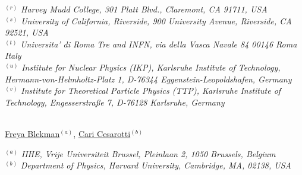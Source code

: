 {\begin{center}
$^{(r)}$ \emph{Harvey Mudd College, 301 Platt Blvd., Claremont, CA 91711, USA}\\
$^{(s)}$ \emph{University of California, Riverside, 900 University Avenue, Riverside, CA 92521, USA}\\
$^{(t)}$ \emph{Universita' di Roma Tre and INFN, via della Vasca Navale 84 00146 Roma Italy}\\
$^{(u)}$ \emph{Institute for Nuclear Physics (IKP), Karlsruhe Institute of Technology, Hermann-von-Helmholtz-Platz 1, D-76344 Eggenstein-Leopoldshafen, Germany}\\
$^{(v)}$ \emph{Institute for Theoretical Particle Physics (TTP), Karlsruhe Institute of Technology, Engesserstra{\ss}e 7, D-76128 Karlsruhe, Germany}
\end{center}}


\vspace{0.25cm}

\\

\noindent\href{mailto:freya.blekman@cern.ch}{Freya Blekman}$^{(a)}$,
\noindent\href{mailto:ccesarotti@g.harvard.edu}{Cari Cesarotti}$^{(b)}$\\

\vspace{0.25cm}

{\footnotesize
\begin{center}
$^{(a)}$ \emph{IIHE, Vrije Universiteit Brussel, Pleinlaan 2, 1050 Brussels, Belgium}\\
$^{(b)}$ \emph{Department of Physics, Harvard University, Cambridge, MA, 02138, USA}
\end{center}}